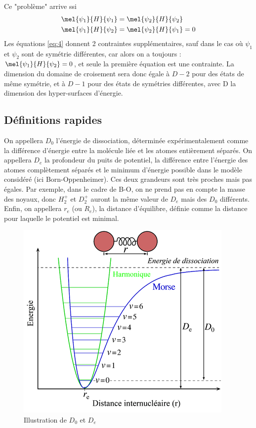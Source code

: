 Ce "problème" arrive ssi 
\begin{equation}\label{eq:4}
    \begin{split}
        & \mel{\psi_1}{H}{\psi_1} = \mel{\psi_2}{H}{\psi_2} \\
        & \mel{\psi_1}{H}{\psi_2} = \mel{\psi_2}{H}{\psi_1} = 0\\
    \end{split}
\end{equation}
Les équations \ref{eq:4} donnent 2 contraintes supplémentaires, sauf dans le cas où $\psi_1$ et $\psi_2$ sont de symétrie différentes, car alors on a toujours : $\mel{\psi_1}{H}{\psi_2} = 0$, et seule la première équation est une contrainte.\newline
La dimension du domaine de croisement sera donc égale à $D-2$ pour des états de même symétrie, et à $D-1$ pour des états de symétries différentes, avec D la dimension des hyper-surfaces d'énergie.\newline

\subsection{Définitions rapides}

On appellera $D_0$ l'énergie de dissociation, déterminée expérimentalement comme la différence d'énergie entre la molécule liée et les atomes entièrement séparés.\newline
On appellera $D_e$ la profondeur du puits de potentiel, la différence entre l'énergie des atomes complètement séparés et le minimum d'énergie possible dans le modèle considéré (ici Born-Oppenheimer).\newline
Ces deux grandeurs sont très proches mais pas égales. Par exemple, dans le cadre de B-O, on ne prend pas en compte la masse des noyaux, donc $H^+_2$ et $D^+_2$ auront la même valeur de $D_e$ mais des $D_0$ différents.\newline
Enfin, on appellera $r_e$ (ou $R_e$), la distance d'équilibre, définie comme la distance pour laquelle le potentiel est minimal.
 \begin{figure}[ht]
    \centering
    \includegraphics[scale=0.80]{Images3/400px-Morse-potential-fr.png}
    \caption{Illustration de $D_0$ et $D_e$}
\end{figure}


